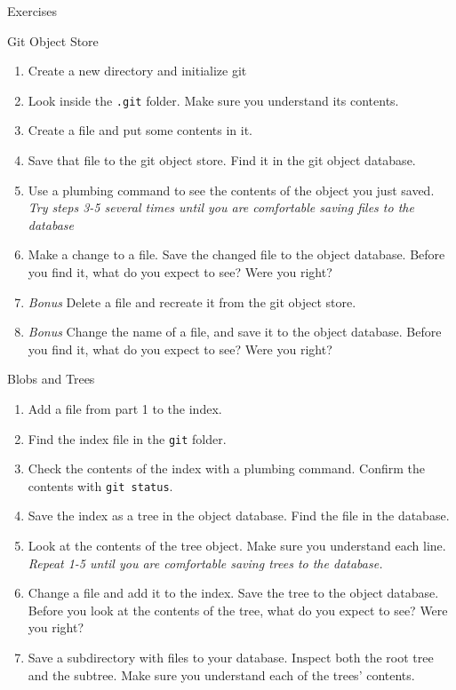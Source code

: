 \documentclass[a4paper]{article}
\begin{document}
\vspace{0.5in}

{\Large Exercises}

\vspace{0.2in}

{\large Git Object Store}

\begin{enumerate}
  \item Create a new directory and initialize git
  \item Look inside the \texttt{.git} folder. Make sure you understand its
		  contents.
  \item Create a file and put some contents in it.
  \item Save that file to the git object store. Find it in the git object
		  database.
  \item Use a plumbing command to see the contents of the object you just saved.
		  \textit{Try steps 3-5 several times until you are comfortable saving
		  files to the database}
  \item Make a change to a file. Save the changed file to the object database.
		  Before you find it, what do you expect to see? Were you right?
  \item \textit{Bonus} Delete a file and recreate it from the git object store.
  \item \textit{Bonus} Change the name of a file, and save it to the object
		  database. Before you find it, what do you expect to see? Were you
		  right?
\end{enumerate}

\vspace{0.2in}

{\large Blobs and Trees}

\begin{enumerate}
  \item Add a file from part 1 to the index.
  \item Find the index file in the \texttt{git} folder.
  \item Check the contents of the index with a plumbing command. Confirm the
		  contents with \texttt{git status}.
  \item Save the index as a tree in the object database. Find the file in the
		  database.
  \item Look at the contents of the tree object. Make sure you understand each
		  line. \textit{Repeat 1-5 until you are comfortable saving trees to the
		  database.}
  \item Change a file and add it to the index. Save the tree to the object
		  database. Before you look at the contents of the tree, what do you
		  expect to see? Were you right?
  \item Save a subdirectory with files to your database. Inspect both the root
		  tree and the subtree. Make sure you understand each of the trees'
		  contents.
\end{enumerate}
\end{document}
